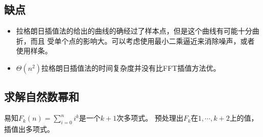 \subsection{缺点}
\begin{itemize}
    \item 拉格朗日插值法的给出的曲线的确经过了样本点，但是这个曲线有可能十分曲折，而且
    受单个点的影响大。可以考虑使用最小二乘逼近来消除噪声，或者使用样条。
    \item $\Theta(n^2)$拉格朗日插值法的时间复杂度并没有比FFT插值方法优。
\end{itemize}
\subsection{求解自然数幂和}\label{psum}
易知$F_k(n)=\displaystyle \sum_{i=0}^n{i^k}$是一个$k+1$次多项式。
预处理出$F_k$在$1,\cdots,k+2$上的值，插值出多项式。
